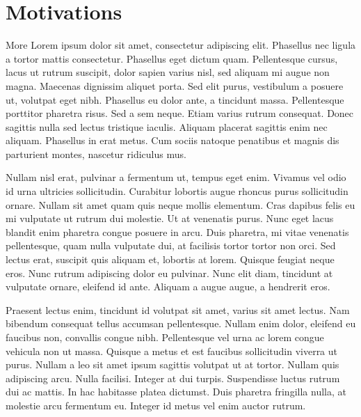 \section{Motivations}
More Lorem ipsum dolor sit amet, consectetur adipiscing elit. Phasellus nec ligula a tortor mattis
consectetur. Phasellus eget dictum quam. Pellentesque cursus, lacus ut rutrum suscipit, dolor sapien varius nisl, sed
aliquam mi augue non magna. Maecenas dignissim aliquet porta. Sed elit purus, vestibulum a posuere ut, volutpat eget
nibh. Phasellus eu dolor ante, a tincidunt massa. Pellentesque porttitor pharetra risus. Sed a sem neque. Etiam varius
rutrum consequat. Donec sagittis nulla sed lectus tristique iaculis. Aliquam placerat sagittis enim nec
aliquam. Phasellus in erat metus. Cum sociis natoque penatibus et magnis dis parturient montes, nascetur ridiculus mus.

\hangindent=1.5cm
\hspace*{1.5cm}Nullam nisl erat, pulvinar a fermentum ut, tempus eget enim. Vivamus vel odio id urna ultricies sollicitudin. Curabitur
lobortis augue rhoncus purus sollicitudin ornare. Nullam sit amet quam quis neque mollis elementum. Cras dapibus felis
eu mi vulputate ut rutrum dui molestie. Ut at venenatis purus. Nunc eget lacus blandit enim pharetra congue posuere in
arcu. Duis pharetra, mi vitae venenatis pellentesque, quam nulla vulputate dui, at facilisis tortor tortor non orci. Sed
lectus erat, suscipit quis aliquam et, lobortis at lorem. Quisque feugiat neque eros. Nunc rutrum adipiscing dolor eu
pulvinar. Nunc elit diam, tincidunt at vulputate ornare, eleifend id ante. Aliquam a augue augue, a hendrerit eros.

\hspace*{1cm}Praesent lectus enim, tincidunt id volutpat sit amet, varius sit amet lectus. Nam bibendum consequat tellus accumsan
pellentesque. Nullam enim dolor, eleifend eu faucibus non, convallis congue nibh. Pellentesque vel urna ac lorem congue
vehicula non ut massa. Quisque a metus et est faucibus sollicitudin viverra ut purus. Nullam a leo sit amet ipsum
sagittis volutpat ut at tortor. Nullam quis adipiscing arcu. Nulla facilisi. Integer at dui turpis. Suspendisse luctus
rutrum dui ac mattis. In hac habitasse platea dictumst. Duis pharetra fringilla nulla, at molestie arcu fermentum
eu. Integer id metus vel enim auctor rutrum.

